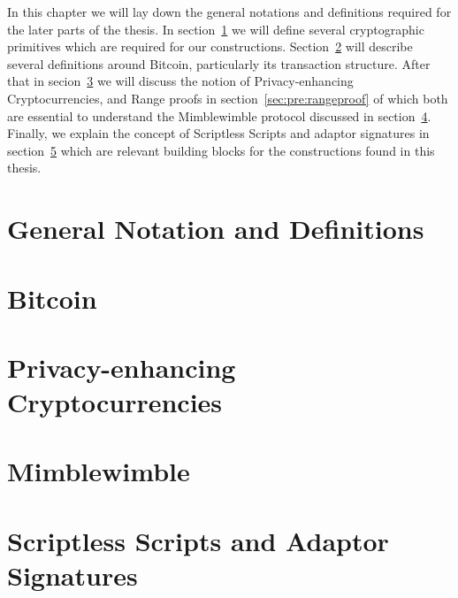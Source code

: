 In this chapter we will lay down the general notations and definitions required for the later parts of the thesis.
In section~\ref{sec:pre:general} we will define several cryptographic primitives which are required for our constructions.
Section~\ref{sec:pre:bitcoin} will describe several definitions around Bitcoin, particularly its transaction structure.
After that in secion~\ref{sec:pre:privacy} we will discuss the notion of Privacy-enhancing Cryptocurrencies, and Range proofs in section~\ref{sec:pre:rangeproof} of which both are essential to understand the Mimblewimble protocol discussed in section~\ref{sec:pre:mimblewimble}.
Finally, we explain the concept of Scriptless Scripts and adaptor signatures in section~\ref{sec:pre:scriptless-scripts} which are relevant building blocks for the constructions found in this thesis.

\section{General Notation and Definitions}\label{sec:pre:general}


\section{Bitcoin} \label{sec:pre:bitcoin}


\section{Privacy-enhancing Cryptocurrencies} \label{sec:pre:privacy}


\section{Mimblewimble} \label{sec:pre:mimblewimble}


\section{Scriptless Scripts and Adaptor Signatures} \label{sec:pre:scriptless-scripts}


